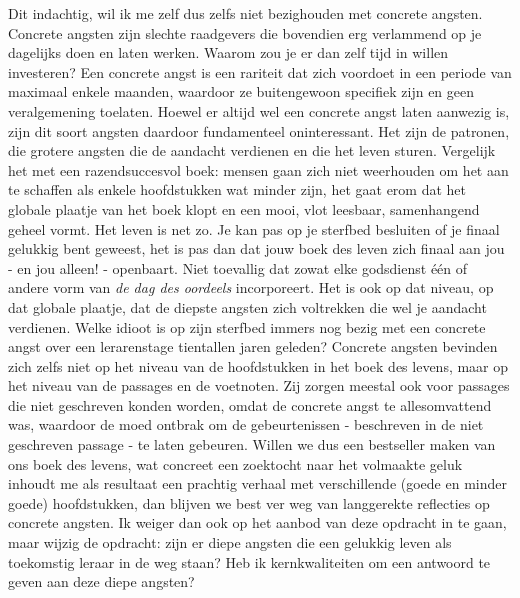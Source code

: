 \documentclass[a4paper,11pt]{article}
\theoremstyle{definition}
\begin{document}
Dit indachtig, wil ik me zelf dus zelfs niet bezighouden met concrete angsten. Concrete angsten 
zijn slechte raadgevers die bovendien erg verlammend op je dagelijks doen en laten werken. Waarom zou je er 
dan zelf tijd in willen investeren? Een concrete angst is een rariteit dat zich 
voordoet in een periode van maximaal enkele maanden, waardoor ze buitengewoon 
specifiek zijn en geen veralgemening toelaten. Hoewel er altijd wel een concrete
angst laten aanwezig is, zijn dit soort angsten daardoor fundamenteel 
oninteressant. Het zijn de patronen, die grotere angsten die de aandacht 
verdienen en die het leven sturen. Vergelijk het met een razendsuccesvol boek: 
mensen gaan zich niet weerhouden om het aan te schaffen als enkele hoofdstukken 
wat minder zijn, het gaat erom dat het globale plaatje van het boek klopt en een 
mooi, vlot leesbaar, samenhangend geheel vormt. Het leven is net zo. Je kan pas 
op je sterfbed besluiten of je finaal gelukkig bent geweest, het is pas dan dat 
jouw boek des leven zich finaal aan jou - en jou alleen! - openbaart. Niet toevallig dat zowat elke godsdienst
één of andere vorm van \emph{de dag des oordeels} incorporeert. Het is ook 
op dat niveau, op dat globale plaatje, dat de diepste angsten zich voltrekken die 
wel je aandacht verdienen. Welke idioot is op zijn sterfbed immers nog bezig met een concrete 
angst over een lerarenstage tientallen jaren geleden? Concrete angsten bevinden zich zelfs niet op het niveau
van de hoofdstukken in het boek des levens, maar op het niveau van de passages en de voetnoten. 
Zij zorgen meestal ook voor passages die niet geschreven konden worden, omdat 
de concrete angst te allesomvattend was, waardoor de moed ontbrak om de gebeurtenissen - beschreven in de niet 
geschreven passage - te laten gebeuren. Willen we dus een bestseller maken van 
ons boek des levens, wat concreet een zoektocht naar het volmaakte geluk inhoudt 
me als resultaat een prachtig verhaal met verschillende (goede en minder goede) 
hoofdstukken, dan blijven we best ver weg van langgerekte reflecties op concrete 
angsten. Ik weiger dan ook op het aanbod van deze opdracht in te gaan, maar wijzig de opdracht:
zijn er diepe angsten die een gelukkig leven als toekomstig leraar in de weg staan? Heb ik kernkwaliteiten
om een antwoord te geven aan deze diepe angsten?\\
 
\end{document}
